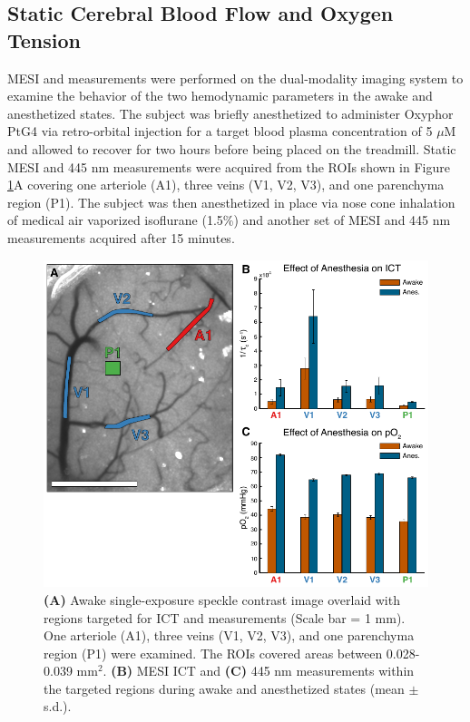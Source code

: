 \subsection{Static Cerebral Blood Flow and Oxygen Tension}

MESI and  measurements were performed on the dual-modality imaging system to examine the behavior of the two hemodynamic parameters in the awake and anesthetized states. The subject was briefly anesthetized to administer Oxyphor PtG4 via retro-orbital injection for a target blood plasma concentration of 5 $\mu$M and allowed to recover for two hours before being placed on the treadmill. Static MESI and 445 nm  measurements were acquired from the ROIs shown in Figure \ref{fig:specklepO2awakeanes}A covering one arteriole (A1), three veins (V1, V2, V3), and one parenchyma region (P1). The subject was then anesthetized in place via nose cone inhalation of medical air vaporized isoflurane (1.5\%) and another set of MESI and 445 nm  measurements acquired after 15 minutes.

\begin{figure}
    \includegraphics{figures/chapter_5/specklepO2awakeanes.pdf}
    \caption{
        \label{fig:specklepO2awakeanes}
        \textbf{(A)} Awake single-exposure speckle contrast image overlaid with regions targeted for ICT and  measurements (Scale bar = 1 mm). One arteriole (A1), three veins (V1, V2, V3), and one parenchyma region (P1) were examined. The ROIs covered areas between 0.028-0.039 mm$^2$. \textbf{(B)} MESI ICT and \textbf{(C)} 445 nm  measurements within the targeted regions during awake and anesthetized states (mean $\pm$ s.d.).
    }
\end{figure}

